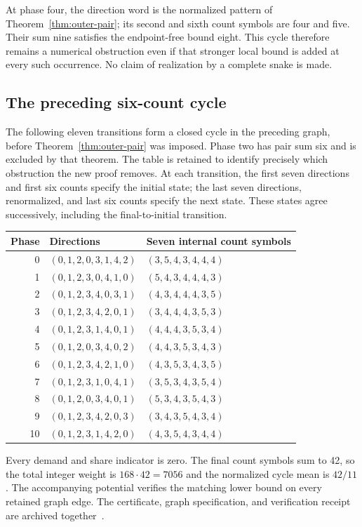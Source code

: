 \documentclass[11pt,a4paper]{article}
\theoremstyle{definition}
\theoremstyle{remark}
\begin{document}
At phase four, the direction word is the normalized pattern of Theorem~\ref{thm:outer-pair}; its second and sixth count symbols are four and five. Their sum nine satisfies the endpoint-free bound eight. This cycle therefore remains a numerical obstruction even if that stronger local bound is added at every such occurrence. No claim of realization by a complete snake is made.

\subsection{The preceding six-count cycle}\label{app:six-count-cycle}
The following eleven transitions form a closed cycle in the preceding graph, before Theorem~\ref{thm:outer-pair} was imposed. Phase two has pair sum six and is excluded by that theorem. The table is retained to identify precisely which obstruction the new proof removes. At each transition, the first seven directions and first six counts specify the initial state; the last seven directions, renormalized, and last six counts specify the next state. These states agree successively, including the final-to-initial transition.
\begin{center}
\begin{tabular}{rll}
\toprule
Phase & Directions & Seven internal count symbols\\\midrule
0 & $(0,1,2,0,3,1,4,2)$ & $(3,5,4,3,4,4,4)$\\
1 & $(0,1,2,3,0,4,1,0)$ & $(5,4,3,4,4,4,3)$\\
2 & $(0,1,2,3,4,0,3,1)$ & $(4,3,4,4,4,3,5)$\\
3 & $(0,1,2,3,4,2,0,1)$ & $(3,4,4,4,3,5,3)$\\
4 & $(0,1,2,3,1,4,0,1)$ & $(4,4,4,3,5,3,4)$\\
5 & $(0,1,2,0,3,4,0,2)$ & $(4,4,3,5,3,4,3)$\\
6 & $(0,1,2,3,4,2,1,0)$ & $(4,3,5,3,4,3,5)$\\
7 & $(0,1,2,3,1,0,4,1)$ & $(3,5,3,4,3,5,4)$\\
8 & $(0,1,2,0,3,4,0,1)$ & $(5,3,4,3,5,4,3)$\\
9 & $(0,1,2,3,4,2,0,3)$ & $(3,4,3,5,4,3,4)$\\
10 & $(0,1,2,3,1,4,2,0)$ & $(4,3,5,4,3,4,4)$\\
\bottomrule
\end{tabular}
\end{center}
Every demand and share indicator is zero. The final count symbols sum to 42, so the total integer weight is $168\cdot42=7056$ and the normalized cycle mean is $42/11$. The accompanying potential verifies the matching lower bound on every retained graph edge. The certificate, graph specification, and verification receipt are archived together~\cite{sixcountarchive}.
\end{document}
